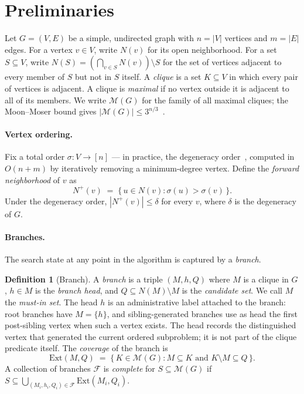 \documentclass[sigconf, nonacm]{acmart}
\theoremstyle{definition}
\newtheorem{definition}[theorem]{Definition}
\theoremstyle{remark}
\begin{document}
\section{Preliminaries}
\label{sec:prelim}

Let $G = (V, E)$ be a simple, undirected graph with $n = |V|$ vertices and
$m = |E|$ edges.  For a vertex $v \in V$, write $N(v)$ for its open
neighborhood.  For a set $S \subseteq V$, write $N(S) = (\bigcap_{v \in S}
N(v)) \setminus S$ for the set of vertices adjacent to every member of $S$ but
not in $S$ itself.  A \emph{clique} is a set $K \subseteq V$ in which every
pair of vertices is adjacent.  A clique is \emph{maximal} if no vertex outside
it is adjacent to all of its members.  We write $\mathcal{M}(G)$ for the family
of all maximal cliques; the Moon--Moser bound gives $|\mathcal{M}(G)| \le
3^{n/3}$~\cite{moon1965cliques}.

\paragraph{Vertex ordering.}
Fix a total order $\sigma \colon V \to [n]$ --- in practice, the degeneracy
order~\cite{eppstein2010listing}, computed in $O(n+m)$ by iteratively removing a
minimum-degree vertex.  Define the \emph{forward neighborhood} of $v$ as
\[
  N^+(v) \;=\; \bigl\{\, u \in N(v) : \sigma(u) > \sigma(v) \,\bigr\}.
\]
Under the degeneracy order, $|N^+(v)| \le \delta$ for every $v$, where $\delta$
is the degeneracy of $G$.

\paragraph{Branches.}
The search state at any point in the algorithm is captured by a \emph{branch}.

\begin{definition}[Branch]\label{def:branch}
A \emph{branch} is a triple $(M, h, Q)$ where $M$ is a clique in $G$,
$h \in M$ is the \emph{branch head}, and $Q \subseteq N(M) \setminus M$ is the
\emph{candidate set}.  We call $M$ the \emph{must-in set}.  The head $h$ is an
administrative label attached to the branch: root branches have $M=\{h\}$, and
sibling-generated branches use as head the first post-sibling vertex when such a
vertex exists.  The head records the distinguished vertex that generated the
current ordered subproblem; it is not part of the clique predicate itself.  The
\emph{coverage} of the branch is
\[
  \mathrm{Ext}(M, Q) \;=\;
  \bigl\{\, K \in \mathcal{M}(G) : M \subseteq K
  \text{ and } K \setminus M \subseteq Q \,\bigr\}.
\]
A collection of branches $\mathcal{F}$ is \emph{complete} for $S \subseteq
\mathcal{M}(G)$ if $S \subseteq \bigcup_{(M_i, h_i, Q_i) \in \mathcal{F}}
\mathrm{Ext}(M_i, Q_i)$.
\end{definition}
\end{document}

